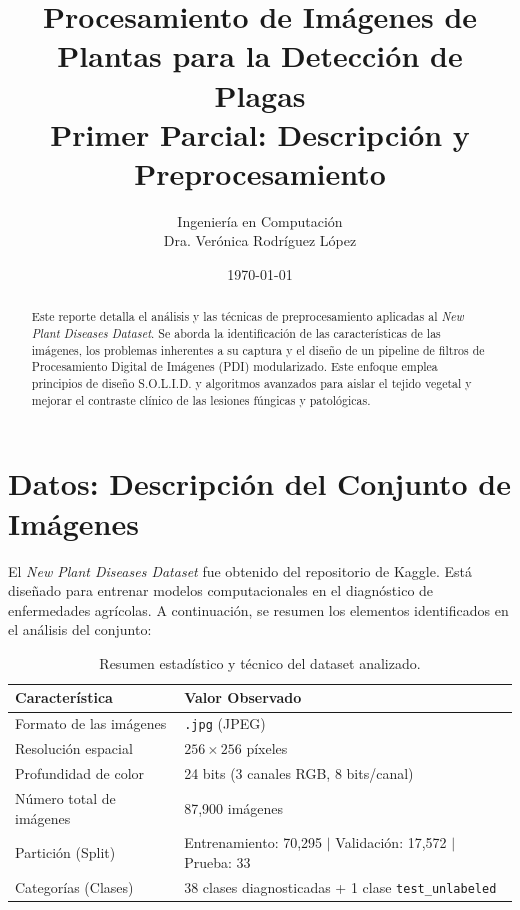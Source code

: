 \documentclass[11pt,a4paper]{article}
\title{\textbf{Procesamiento de Imágenes de Plantas para la Detección de Plagas}\\
\Large Primer Parcial: Descripción y Preprocesamiento}
\author{Ingeniería en Computación\\
Dra. Verónica Rodríguez López}
\date{\today}
\begin{document}
\maketitle

\begin{abstract}
Este reporte detalla el análisis y las técnicas de preprocesamiento aplicadas al \textit{New Plant Diseases Dataset}. Se aborda la identificación de las características de las imágenes, los problemas inherentes a su captura y el diseño de un pipeline de filtros de Procesamiento Digital de Imágenes (PDI) modularizado. Este enfoque emplea principios de diseño S.O.L.I.D. y algoritmos avanzados para aislar el tejido vegetal y mejorar el contraste clínico de las lesiones fúngicas y patológicas.
\end{abstract}

\section{Datos: Descripción del Conjunto de Imágenes}
El \textit{New Plant Diseases Dataset} fue obtenido del repositorio de Kaggle. Está diseñado para entrenar modelos computacionales en el diagnóstico de enfermedades agrícolas. A continuación, se resumen los elementos identificados en el análisis del conjunto:

\begin{table}[H]
    \centering
    \renewcommand{\arraystretch}{1.2}
    \begin{tabular}{@{}ll@{}}
        \toprule
        \textbf{Característica} & \textbf{Valor Observado} \\ \midrule
        Formato de las imágenes & \texttt{.jpg} (JPEG) \\
        Resolución espacial & $256 \times 256$ píxeles \\
        Profundidad de color & 24 bits (3 canales RGB, 8 bits/canal) \\
        Número total de imágenes & 87,900 imágenes \\
        Partición (Split) & Entrenamiento: 70,295 $\vert$ Validación: 17,572 $\vert$ Prueba: 33 \\
        Categorías (Clases) & 38 clases diagnosticadas + 1 clase \texttt{test\_unlabeled} \\ \bottomrule
    \end{tabular}
    \caption{Resumen estadístico y técnico del dataset analizado.}
    \label{tab:dataset_stats}
\end{table}
\end{document}
